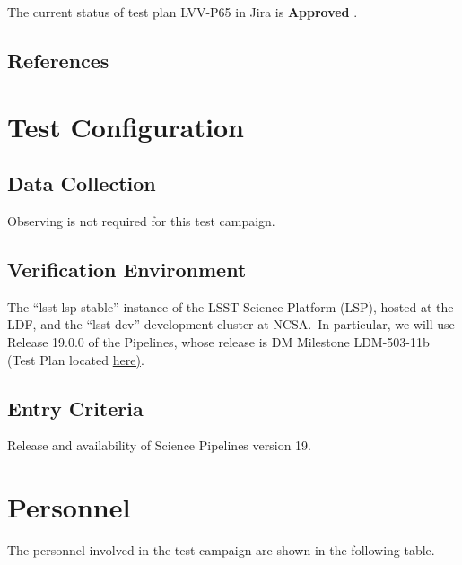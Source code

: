 \documentclass[DM,STR,toc]{lsstdoc}
\begin{document}
The current status of test plan LVV-P65 in Jira is \textbf{ Approved }.

\subsection{References}
\label{sect:references}
\renewcommand{\refname}{}

\section{Test Configuration}
\label{sect:configuration}

\subsection{Data Collection}

  Observing is not required for this test campaign.

\subsection{Verification Environment}
\label{sect:hwconf}
   The ``lsst-lsp-stable'' instance of the LSST Science Platform (LSP),
hosted at the LDF, and the ``lsst-dev'' development cluster at NCSA.~In
particular, we will use Release 19.0.0 of the Pipelines, whose release
is DM Milestone LDM-503-11b (Test Plan located
\href{https://jira.lsstcorp.org/secure/Tests.jspa\#/testPlan/LVV-P62}{here)}.


  \subsection{Entry Criteria}
   Release and availability of Science Pipelines version 19.




\newpage
\section{Personnel}
\label{sect:personnel}

The personnel involved in the test campaign are shown in the following table.
\end{document}
